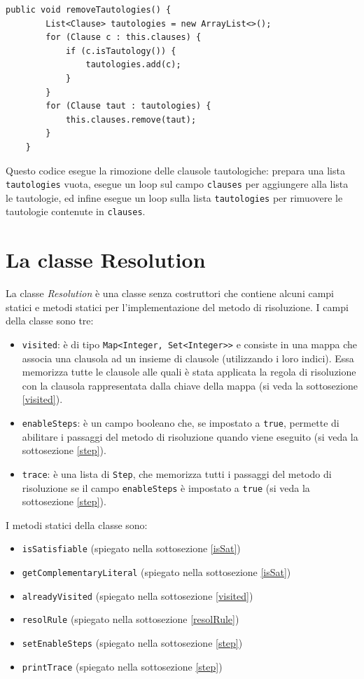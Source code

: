 \documentclass[a4paper,12pt]{report}
\begin{document}
\begin{lstlisting}[caption={Metodo ``removeTautologies'' della classe ClauseSet}, label={remtaut}]
    public void removeTautologies() {
        List<Clause> tautologies = new ArrayList<>();
        for (Clause c : this.clauses) {
            if (c.isTautology()) {
                tautologies.add(c);
            }
        }
        for (Clause taut : tautologies) {
            this.clauses.remove(taut);
        }
    }
\end{lstlisting}
Questo codice esegue la rimozione delle clausole tautologiche: prepara una lista \texttt{tautologies} vuota, esegue un loop sul campo \texttt{clauses} per aggiungere alla lista le tautologie, ed infine esegue un loop sulla lista \texttt{tautologies} per rimuovere le tautologie contenute in \texttt{clauses}.

\section{La classe Resolution}
La classe \textit{Resolution} è una classe senza costruttori che contiene alcuni campi statici e metodi statici per l'implementazione del metodo di risoluzione. I campi della classe sono tre:
\begin{itemize}
    \item \texttt{visited}: è di tipo \texttt{Map<Integer, Set<Integer>>} e consiste in una mappa che associa una clausola ad un insieme di clausole (utilizzando i loro indici). Essa memorizza tutte le clausole alle quali è stata applicata la regola di risoluzione con la clausola rappresentata dalla chiave della mappa (si veda la sottosezione \ref{visited}).
    \item \texttt{enableSteps}: è un campo booleano che, se impostato a \texttt{true}, permette di abilitare i passaggi del metodo di risoluzione quando viene eseguito (si veda la sottosezione \ref{step}).
    \item \texttt{trace}: è una lista di \texttt{Step}, che memorizza tutti i passaggi del metodo di risoluzione se il campo \texttt{enableSteps} è impostato a \texttt{true} (si veda la sottosezione \ref{step}).
\end{itemize}

I metodi statici della classe sono:
\begin{itemize}
    \item \texttt{isSatisfiable} (spiegato nella sottosezione \ref{isSat})
    \item \texttt{getComplementaryLiteral} (spiegato nella sottosezione \ref{isSat})
    \item \texttt{alreadyVisited} (spiegato nella sottosezione \ref{visited})
    \item \texttt{resolRule} (spiegato nella sottosezione \ref{resolRule})
    \item \texttt{setEnableSteps} (spiegato nella sottosezione \ref{step})
    \item \texttt{printTrace} (spiegato nella sottosezione \ref{step})
\end{itemize}
\end{document}
